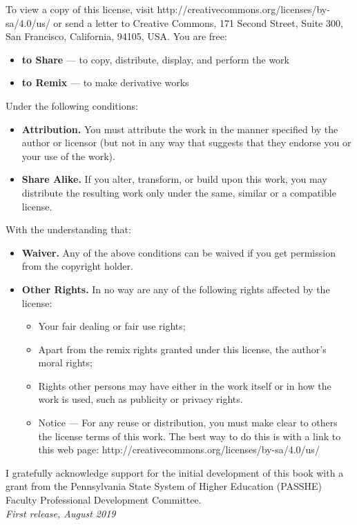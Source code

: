 \documentclass{book}
\newcommand{\<}{\left\langle}
\renewcommand{\>}{\right\rangle}
\theoremstyle{definition}
\begin{document}
To view a copy of this license, visit http://creativecommons.org/licenses/by-sa/4.0/us/ or send a letter to Creative Commons, 171 Second Street, Suite 300, San Francisco, California, 94105, USA.
You are free:
\begin{itemize}
	\item {\bf to Share} — to copy, distribute, display, and perform the work
	\item {\bf to Remix} — to make derivative works
\end{itemize}
Under the following conditions:
\begin{itemize}
	\item {\bf Attribution.} You must attribute the work in the manner specified by the author or licensor (but not in any way that suggests that they endorse you or your use of the work).
	\item {\bf Share Alike.} If you alter, transform, or build upon this work, you may distribute the resulting work only under the same, similar or a compatible license.
\end{itemize}
With the understanding that:
\begin{itemize}
	\item {\bf Waiver.} Any of the above conditions can be waived if you get permission from the copyright holder.
	\item {\bf Other Rights.} In no way are any of the following rights affected by the license:
		\begin{itemize}
			\item Your fair dealing or fair use rights;
			\item Apart from the remix rights granted under this license, the author's moral rights;
			\item Rights other persons may have either in the work itself or in how the work is used, such as publicity or privacy rights.
			\item Notice — For any reuse or distribution, you must make clear to others the license terms of this work. The best way to do this is with a link to this web page:
http://creativecommons.org/licenses/by-sa/4.0/us/
\end{itemize}
\end{itemize}
 I gratefully acknowledge support for the initial development of this book with a grant from the Pennsylvania State System of Higher Education (PASSHE) Faculty Professional Development Committee. \\ %

\noindent \textit{First release, August 2019} %

\tableofcontents
\setcounter{chapter}{-1}







\backmatter



\clearpage
{}
\printindex

\end{document}
